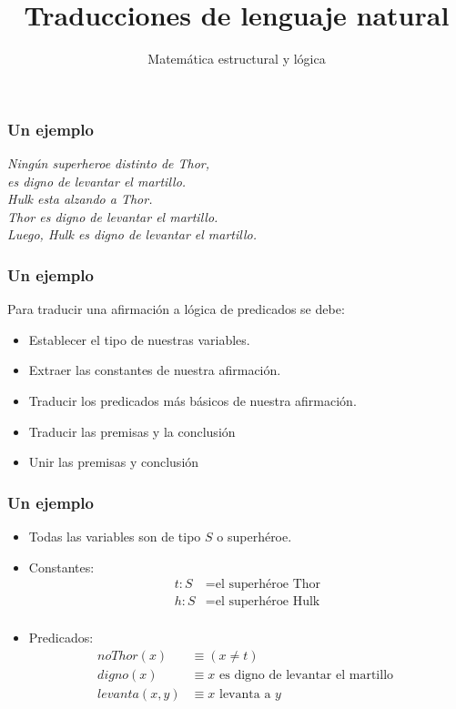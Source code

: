 \documentclass{beamer}
\title{Traducciones de lenguaje natural}
\author{Matemática estructural y lógica}
\institute{ISIS-1104}
\date{}
\begin{document}
\frame{\titlepage}

\begin{frame}[fragile]
    \frametitle{Un ejemplo}
    \begin{center}
        \textit{Ningún superheroe distinto de Thor, \\
        es digno de levantar el martillo. \\
        Hulk esta alzando a Thor. \\
        Thor es digno de levantar el martillo. \\
        Luego, Hulk es digno de levantar el martillo.}
    \end{center}
\end{frame}

\begin{frame}[fragile]
    \frametitle{Un ejemplo}
    \pause
    Para traducir una afirmación a lógica de predicados se debe:
    \begin{itemize}
        \pause
        \item Establecer el tipo de nuestras variables.
        \pause
        \item Extraer las constantes de nuestra afirmación.
        \pause
        \item Traducir los predicados más básicos de nuestra afirmación.
        \pause
        \item Traducir las premisas y la conclusión
        \pause
        \item Unir las premisas y conclusión
    \end{itemize}
\end{frame}

\begin{frame}[fragile]
    \frametitle{Un ejemplo}
    \begin{itemize}
        \pause
        \item Todas las variables son de tipo $S$ o superhéroe.
        \pause
        \item Constantes:
            \begin{align*}
                t : S &= \text{el superhéroe Thor} \\
                h : S &= \text{el superhéroe Hulk} \\
            \end{align*}
        \pause
        \item Predicados:
            \begin{align*}
                noThor(x) &\equiv (x \neq t) \\
                digno(x) &\equiv x\text{ es digno de levantar el martillo } \\
                levanta(x, y) &\equiv x\text{ levanta a }y \\
            \end{align*}
    \end{itemize}
\end{frame}
\end{document}
